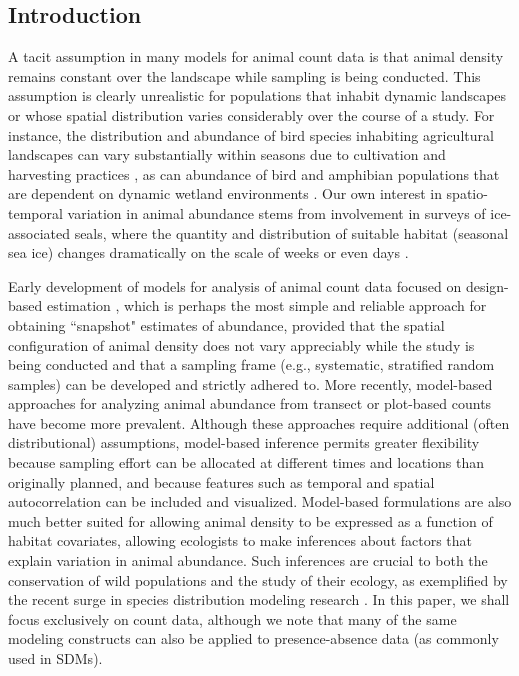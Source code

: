\documentclass[12pt,english]{article}
\begin{document}
\begin{spacing}{1.9}
\section{Introduction}

A tacit assumption in many models for animal count data is that animal density remains constant over
the landscape while sampling is being conducted.  This assumption is clearly unrealistic for populations that inhabit dynamic landscapes or whose spatial distribution varies considerably over the course of a study. For instance, the distribution and abundance of bird species inhabiting agricultural landscapes can vary substantially within seasons due to cultivation and harvesting practices \citep{MillerEtAl11jwm}, as can abundance of bird and amphibian populations that are dependent on dynamic wetland environments \citep{MurkinEtAl1997,BabbittTanner2000}.   Our own interest in spatio-temporal variation in animal abundance stems from involvement in surveys of ice-associated seals, where the quantity and distribution of suitable habitat (seasonal sea ice) changes dramatically on the scale of weeks or even days \citep{VerHoefJansen2007,VerHoefEtAl2014}.

Early development of models for analysis of animal count data \citep[see e.g.,][and references therein]{BucklandEtAl2001} focused on design-based estimation \citep[cf.][]{Cochran1977}, which is perhaps the most simple and reliable approach for obtaining ``snapshot" estimates of abundance, provided that the spatial configuration of animal density does not vary appreciably while the study is being conducted and that a sampling frame (e.g., systematic, stratified random samples) can be developed and strictly adhered to.  More recently, model-based approaches for analyzing animal abundance from transect or plot-based counts \citep[e.g.,][]{HedleyBuckland2004,VerHoefJansen2007,JohnsonEtAl2010} have become more prevalent. Although these approaches require additional (often distributional) assumptions, model-based inference permits greater flexibility because sampling effort can be allocated at different times and locations than originally planned, and because features such as temporal \citep{Moore2011} and spatial \citep[see e.g.,][]{MillerEtAl2013} autocorrelation can be included and visualized.  Model-based formulations are also much better suited for allowing animal density to be expressed as a function of habitat covariates, allowing ecologists to make inferences about factors that explain variation in animal abundance.  Such inferences are crucial to both the conservation of wild populations and the study of their ecology, as exemplified by the recent surge in species distribution modeling research \citep[SDMs; see e.g.,][]{GuisanThuiller2005,ElithLeathwick2009}.  In this paper, we shall focus exclusively on count data, although we note that many of the same modeling constructs can also be applied to presence-absence data (as commonly used in SDMs).


\end{spacing}
\end{document}
